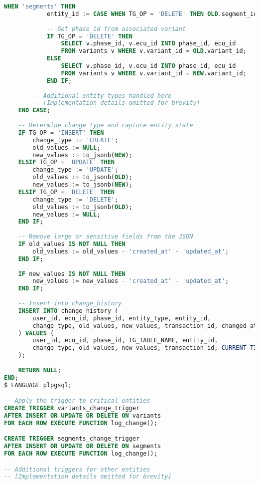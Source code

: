 \begin{lstlisting}[language=SQL, caption={Change Tracking Trigger}, label={lst:change-tracking-trigger}]
        WHEN 'segments' THEN 
            entity_id := CASE WHEN TG_OP = 'DELETE' THEN OLD.segment_id ELSE NEW.segment_id END;
            
            -- Get phase_id from associated variant
            IF TG_OP = 'DELETE' THEN
                SELECT v.phase_id, v.ecu_id INTO phase_id, ecu_id 
                FROM variants v WHERE v.variant_id = OLD.variant_id;
            ELSE
                SELECT v.phase_id, v.ecu_id INTO phase_id, ecu_id 
                FROM variants v WHERE v.variant_id = NEW.variant_id;
            END IF;
            
        -- Additional entity types handled here
        -- [Implementation details omitted for brevity]
    END CASE;
    
    -- Determine change type and capture entity state
    IF TG_OP = 'INSERT' THEN
        change_type := 'CREATE';
        old_values := NULL;
        new_values := to_jsonb(NEW);
    ELSIF TG_OP = 'UPDATE' THEN
        change_type := 'UPDATE';
        old_values := to_jsonb(OLD);
        new_values := to_jsonb(NEW);
    ELSIF TG_OP = 'DELETE' THEN
        change_type := 'DELETE';
        old_values := to_jsonb(OLD);
        new_values := NULL;
    END IF;
    
    -- Remove large or sensitive fields from the JSON
    IF old_values IS NOT NULL THEN
        old_values := old_values - 'created_at' - 'updated_at';
    END IF;
    
    IF new_values IS NOT NULL THEN
        new_values := new_values - 'created_at' - 'updated_at';
    END IF;
    
    -- Insert into change_history
    INSERT INTO change_history (
        user_id, ecu_id, phase_id, entity_type, entity_id,
        change_type, old_values, new_values, transaction_id, changed_at
    ) VALUES (
        user_id, ecu_id, phase_id, TG_TABLE_NAME, entity_id,
        change_type, old_values, new_values, transaction_id, CURRENT_TIMESTAMP
    );
    
    RETURN NULL;
END;
$ LANGUAGE plpgsql;

-- Apply the trigger to critical entities
CREATE TRIGGER variants_change_trigger
AFTER INSERT OR UPDATE OR DELETE ON variants
FOR EACH ROW EXECUTE FUNCTION log_change();

CREATE TRIGGER segments_change_trigger
AFTER INSERT OR UPDATE OR DELETE ON segments
FOR EACH ROW EXECUTE FUNCTION log_change();

-- Additional triggers for other entities
-- [Implementation details omitted for brevity]
\end{lstlisting}

